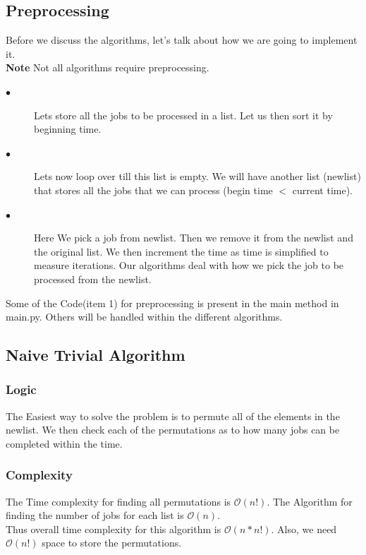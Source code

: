 \documentclass[11pt]{article}
\begin{document}
{				\subsection{Preprocessing}
				Before we discuss the algorithms, let's talk about how we are going to implement it.\\
				\textbf{Note} Not all algorithms require preprocessing.
				
				\begin{description}
					\item[$\bullet$] Lets store all the jobs to be processed in a list. Let us then sort it by beginning time.
					\item[$\bullet$] Lets now loop over till this list is empty. We will have another list (newlist) that stores all the jobs that we can process (begin time $<$ current time).
					\item[$\bullet$] Here We pick a job from newlist. Then we remove it from the newlist and the original list. We then increment the time as time is simplified to measure iterations. Our algorithms deal with how we pick the job to be processed from the newlist.
				\end{description}
				Some of the Code(item 1) for preprocessing is present in the main method in main.py. Others will be handled within the different algorithms.
				
				\subsection{Naive Trivial Algorithm}
				\subsubsection{Logic}
				The Easiest way to solve the problem is to permute all of the elements in the newlist. We then check each of the permutations as to how many jobs can be completed within the time.
				
				\subsubsection{Complexity}
				The Time complexity for finding all permutations is $\mathcal{O}(n!)$. The Algorithm for finding the number of jobs for each list is $\mathcal{O}(n)$. \\
				Thus overall time complexity for this algorithm is $\mathcal{O}(n*n!)$.
				Also, we need $\mathcal{O}(n!)$ space to store the permutations.
				
}
\end{document}
